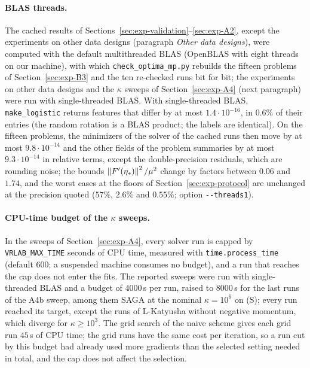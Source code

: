 \paragraph{BLAS threads.}
The cached results of Sections~\ref{sec:exp-validation}--\ref{sec:exp-A2}, except the experiments on other data designs
(paragraph \emph{Other data designs}), were computed with the default multithreaded BLAS (OpenBLAS with eight threads on
our machine), with which \nolinkurl{check_optima_mp.py} rebuilds the fifteen problems of Section~\ref{sec:exp-B3} and
the ten re-checked runs bit for bit; the experiments on other data designs and the $\kappa$ sweeps of
Section~\ref{sec:exp-A4} (next paragraph) were run with single-threaded BLAS. With single-threaded BLAS, \nolinkurl{make_logistic} returns features
that differ by at most $1.4\cdot10^{-16}$, in $0.6\%$ of their entries (the random rotation is a BLAS product; the labels
are identical). On the fifteen problems, the minimizers of the solver of the cached runs then move by at most
$9.8\cdot10^{-14}$ and the other fields of the problem summaries by at most $9.3\cdot10^{-14}$ in relative terms, except
the double-precision residuals, which are rounding noise; the bounds $\left\|F'(\eta_\ast)\right\|^2/\mu^2$ change by factors
between $0.06$ and $1.74$, and the worst cases at the floors of Section~\ref{sec:exp-protocol} are unchanged at the
precision quoted ($57\%$,
$2.6\%$ and $0.55\%$; option \texttt{-{}-threads1}).

\paragraph{CPU-time budget of the $\kappa$ sweeps.} In the sweeps of Section~\ref{sec:exp-A4}, every solver run is capped
by \nolinkurl{VRLAB_MAX_TIME} seconds of CPU time, measured with \texttt{time.process\_time} (default $600$; a suspended
machine consumes no budget), and a run that reaches the cap does not enter the fits. The reported sweeps were run with
single-threaded BLAS and a budget of $4000$\,s per run, raised to $8000$\,s for the last runs of the A4b sweep, among them
SAGA at the nominal $\kappa=10^6$ on (S); every run reached its target, except the runs of L-Katyusha without negative
momentum, which diverge for $\kappa\ge10^3$. The grid search of the naive scheme gives each grid run $45$\,s of CPU time;
the grid runs have the same cost per iteration, so a run cut by this budget had already used more gradients than the
selected setting needed in total, and the cap does not affect the selection.


